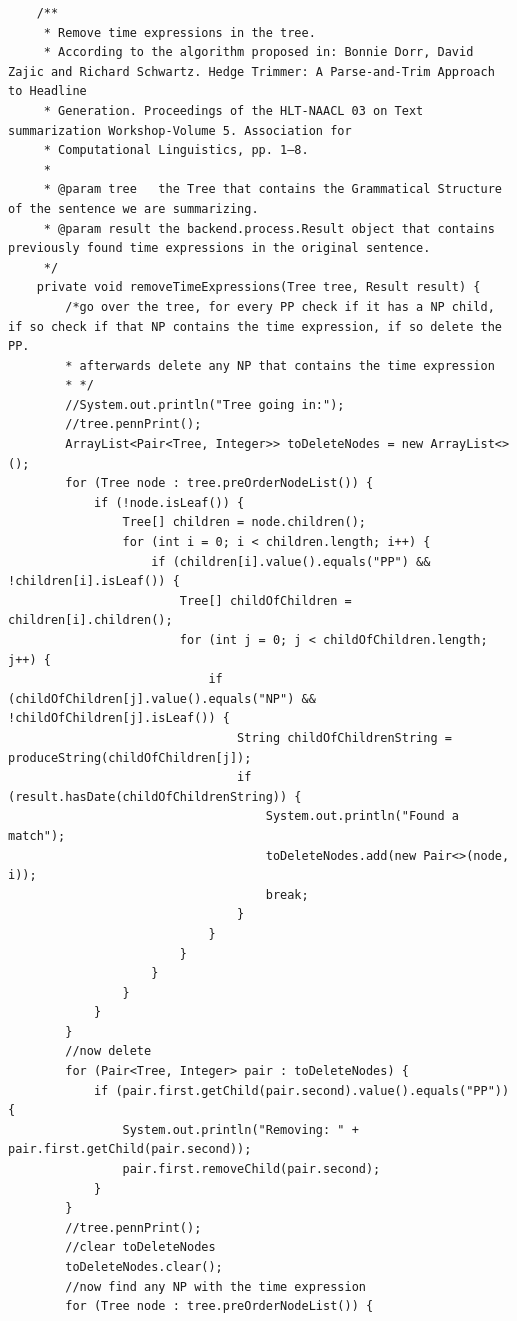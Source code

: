 \begin{lstlisting}
    /**
     * Remove time expressions in the tree.
     * According to the algorithm proposed in: Bonnie Dorr, David Zajic and Richard Schwartz. Hedge Trimmer: A Parse-and-Trim Approach to Headline
     * Generation. Proceedings of the HLT-NAACL 03 on Text summarization Workshop-Volume 5. Association for
     * Computational Linguistics, pp. 1–8.
     *
     * @param tree   the Tree that contains the Grammatical Structure of the sentence we are summarizing.
     * @param result the backend.process.Result object that contains previously found time expressions in the original sentence.
     */
    private void removeTimeExpressions(Tree tree, Result result) {
        /*go over the tree, for every PP check if it has a NP child, if so check if that NP contains the time expression, if so delete the PP.
        * afterwards delete any NP that contains the time expression
        * */
        //System.out.println("Tree going in:");
        //tree.pennPrint();
        ArrayList<Pair<Tree, Integer>> toDeleteNodes = new ArrayList<>();
        for (Tree node : tree.preOrderNodeList()) {
            if (!node.isLeaf()) {
                Tree[] children = node.children();
                for (int i = 0; i < children.length; i++) {
                    if (children[i].value().equals("PP") && !children[i].isLeaf()) {
                        Tree[] childOfChildren = children[i].children();
                        for (int j = 0; j < childOfChildren.length; j++) {
                            if (childOfChildren[j].value().equals("NP") && !childOfChildren[j].isLeaf()) {
                                String childOfChildrenString = produceString(childOfChildren[j]);
                                if (result.hasDate(childOfChildrenString)) {
                                    System.out.println("Found a match");
                                    toDeleteNodes.add(new Pair<>(node, i));
                                    break;
                                }
                            }
                        }
                    }
                }
            }
        }
        //now delete
        for (Pair<Tree, Integer> pair : toDeleteNodes) {
            if (pair.first.getChild(pair.second).value().equals("PP")) {
                System.out.println("Removing: " + pair.first.getChild(pair.second));
                pair.first.removeChild(pair.second);
            }
        }
        //tree.pennPrint();
        //clear toDeleteNodes
        toDeleteNodes.clear();
        //now find any NP with the time expression
        for (Tree node : tree.preOrderNodeList()) {

\end{lstlisting}

